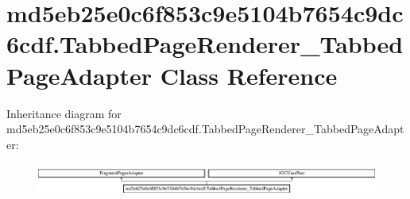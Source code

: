 \hypertarget{classmd5eb25e0c6f853c9e5104b7654c9dc6cdf_1_1TabbedPageRenderer__TabbedPageAdapter}{}\section{md5eb25e0c6f853c9e5104b7654c9dc6cdf.\+Tabbed\+Page\+Renderer\+\_\+\+Tabbed\+Page\+Adapter Class Reference}
\label{classmd5eb25e0c6f853c9e5104b7654c9dc6cdf_1_1TabbedPageRenderer__TabbedPageAdapter}
Inheritance diagram for md5eb25e0c6f853c9e5104b7654c9dc6cdf.\+Tabbed\+Page\+Renderer\+\_\+\+Tabbed\+Page\+Adapter\+:\begin{figure}[H]
\begin{center}
\leavevmode
\includegraphics[height=1.093750cm]{classmd5eb25e0c6f853c9e5104b7654c9dc6cdf_1_1TabbedPageRenderer__TabbedPageAdapter}
\end{center}
\end{figure}
